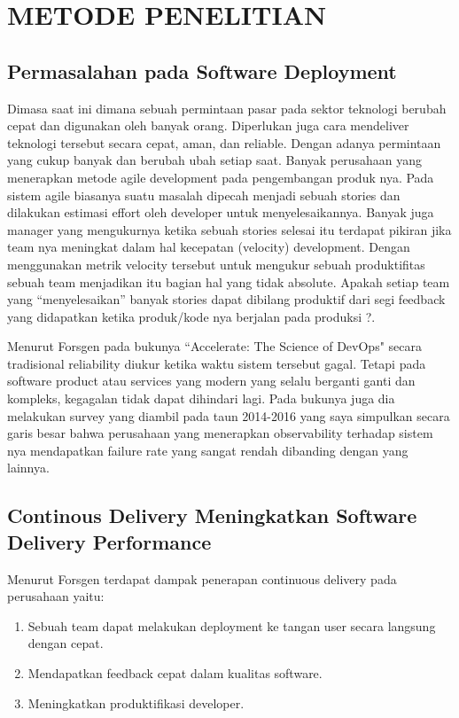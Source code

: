 \chapter{METODE PENELITIAN}

%
\vspace{4.5pt}

\section{Permasalahan pada Software Deployment}
Dimasa saat ini dimana sebuah permintaan pasar pada sektor teknologi berubah cepat dan digunakan oleh banyak orang. Diperlukan juga cara mendeliver  teknologi tersebut secara cepat, aman, dan reliable.
Dengan adanya permintaan yang cukup banyak dan berubah ubah setiap saat.
Banyak perusahaan yang menerapkan metode agile development pada pengembangan produk nya.
Pada sistem agile biasanya suatu masalah dipecah menjadi sebuah stories dan dilakukan  estimasi effort oleh developer untuk menyelesaikannya.
Banyak juga manager yang  mengukurnya ketika sebuah stories selesai itu terdapat pikiran jika team nya
meningkat dalam hal kecepatan (velocity) development. Dengan menggunakan  metrik velocity tersebut untuk mengukur sebuah produktifitas sebuah team  menjadikan itu bagian hal yang tidak absolute.
Apakah setiap team yang  “menyelesaikan” banyak stories dapat dibilang produktif dari segi feedback yang  didapatkan ketika produk/kode nya berjalan pada produksi ?.
\par
Menurut Forsgen pada bukunya ``Accelerate: The Science of DevOps" \cite{Forsgen2018} secara tradisional reliability diukur ketika waktu sistem tersebut  gagal.
Tetapi pada software product atau services yang modern yang selalu berganti  ganti dan kompleks, kegagalan tidak dapat dihindari lagi.
Pada bukunya juga dia  melakukan survey yang diambil pada taun 2014-2016 yang saya simpulkan secara  garis besar bahwa perusahaan
yang menerapkan observability terhadap sistem nya  mendapatkan failure rate yang sangat rendah dibanding dengan yang lainnya.

\vspace{0.5cm}
\section{Continous Delivery Meningkatkan Software Delivery Performance}
Menurut Forsgen \cite{Forsgen2018} terdapat dampak penerapan continuous delivery pada perusahaan yaitu:
\begin{enumerate}[label=\alph*.]
    \item Sebuah team dapat melakukan deployment ke tangan user secara langsung dengan cepat.
    \item Mendapatkan feedback cepat dalam kualitas software.
    \item Meningkatkan produktifikasi developer.
\end{enumerate}
\vspace{0.5cm}
